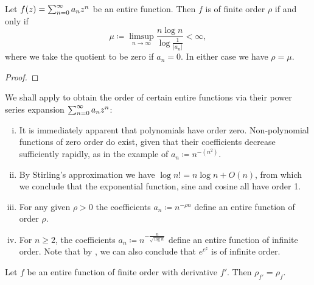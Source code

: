 
\begin{theorem} \label{thm:order-power-series}
    Let $f(z) = \sum_{n=0}^\infty {a_n}z^{n}$ be an entire function. Then $f$ is of finite order $\rho$ if and only if
    $$ \mu \coloneqq \limsup_{n \to \infty} \frac{n \log n}{\log \frac{1}{\vert a_n \vert}} < \infty, $$
    where we take the quotient to be zero if $a_n = 0$. In either case we have $\rho = \mu$.
\end{theorem}

\begin{proof}
\end{proof}

\begin{example} \label{exm:examples-orders}
    We shall apply  to obtain the order of certain entire functions via their power series expansion $ \sum_{n=0}^\infty {a_n}z^{n} $:

    \begin{enumerate}[i.]
        \item It is immediately apparent that polynomials have order zero. Non-polynomial functions of zero order do exist, given that their coefficients decrease sufficiently rapidly, as in the example of $a_n \coloneqq n^{-(n^2)} $.
        \item By Stirling's approximation we have $ \log n! = n \log n + O(n) $, from which we conclude that the exponential function, sine and cosine all have order 1.
        \item For any given $\rho > 0$ the coefficients $ a_n \coloneqq n^{- \rho n} $ define an entire function of order $\rho$.
        \item For $n \geq 2$, the coefficients $ a_n \coloneqq n^{- \frac{n}{\sqrt{\log n}}} $ define an entire function of infinite order. Note that by , we can also conclude that $e^{e^z}$ is of infinite order.
    \end{enumerate}
\end{example}



\begin{proposition} \label{prop:order-derivative}
    Let $f$ be an entire function of finite order with derivative $f'$. Then $\rho_{f'} = \rho_f$.
\end{proposition}

